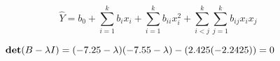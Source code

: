 \documentclass[12pt]{article}
\begin{document}
\pagestyle{empty}
\Large
{}
\pagecolor{ehandbook}


\boldmath
\[
\hat{Y} = b_0 + \sum_{i=1}^k b_i x_i + \sum_{i=1}^k b_{ii} x_{i}^2 + \sum_{i<j}^k \sum_{j=1}^k b_{ij} x_i x_j
\]

\vspace*{.75in}

\[
\hspace*{-.5in}
\mbox{\bf det}(B - \lambda I) = (-7.25-\lambda)(-7.55-\lambda)-(2.425(-2.2425))=0
\]
\end{document}
